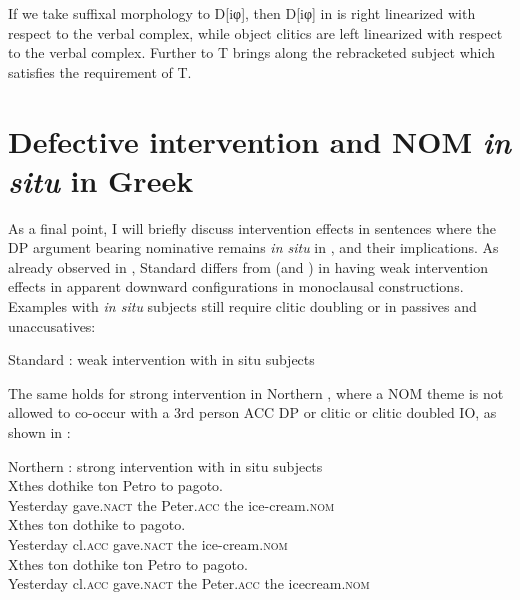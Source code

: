 \documentclass[output=paper]{LSP/langsci}
\begin{document}
If we take suffixal  morphology to  D[iφ], then D[iφ] in  is right linearized with respect to the verbal complex, while object clitics are left linearized with respect to the verbal complex. Further  to T brings along the rebracketed subject which satisfies the  requirement of T.\textstyleFootnoteSymbol{} 

\section{Defective intervention and NOM \textit{in situ} in Greek}

As a final point, I will briefly discuss intervention effects in sentences where the DP argument bearing nominative  remains \textit{in situ} in , and their implications. As already observed in \citet[85]{Anagnostopoulou2003}, Standard  differs from  (and ) in having weak intervention effects in apparent downward  configurations in monoclausal constructions. Examples with \textit{in situ} subjects still require clitic doubling or  in  passives and unaccusatives: 




\ea%
\label{ex:anagnost:39}Standard  : weak intervention with in situ subjects\\
\z
\z

The same holds for strong intervention in Northern , where a NOM theme is not allowed to co-occur with a 3rd person ACC DP or clitic or clitic doubled IO, as shown in :

 
\ea%
    \label{ex:anagnost:40}
  	 Northern : strong intervention with in situ subjects  \\
\ea
\gll *Xthes dothike ton Petro to pagoto.\\
  Yesterday gave.\textsc{nact} the Peter.\textsc{acc} the ice-cream.\textsc{nom}\\
\ex
\gll *Xthes ton dothike to pagoto.\\
  Yesterday cl.\textsc{acc} gave.\textsc{nact} the ice-cream.\textsc{nom}\\
\ex
\gll *Xthes ton dothike ton Petro to pagoto.\\
   Yesterday cl.\textsc{acc} gave.\textsc{nact} the Peter.\textsc{acc} the icecream.\textsc{nom}\\
\end{document}

